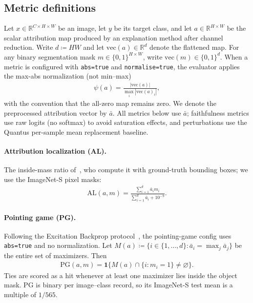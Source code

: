 \documentclass[twoside]{article}
\newcommand{\RR}{\mathbb{R}}
\newcommand{\1}{\mathbf{1}}
\begin{document}
\subsection{Metric definitions}\label{app:metrics}

Let $x \in \RR^{C \times H \times W}$ be an image, let $y$ be its target class, and let $a \in
    \RR^{H \times W}$ be the scalar attribution map produced by an explanation method after channel
reduction. Write $d \coloneqq HW$ and let $\text{vec}(a) \in \RR^d$ denote the flattened map. For
any binary segmentation mask $m \in \{0,1\}^{H \times W}$, write $\text{vec}(m) \in \{0,1\}^d$.
When a metric is configured with \texttt{abs=true} and \texttt{normalise=true}, the evaluator
applies the max-abs normalization (not min--max)
\begin{align}
    \psi(a) = \frac{|\text{vec}(a)|}{\max_i |\text{vec}(a)_i|},
\end{align}
with the convention that the all-zero map remains zero. We denote the preprocessed attribution
vector by $\bar{a}$. All metrics below use $\bar{a}$; faithfulness metrics use raw logits (no
softmax) to avoid saturation effects, and perturbations use the Quantus per-sample mean replacement
baseline.

\paragraph{Attribution localization (AL).} The inside-mass ratio of~\citet{Kohlbrenner2020}, who compute it with ground-truth bounding boxes;
we use the ImageNet-S pixel masks:
\begin{align}
    \text{AL}(a, m) = \frac{\sum_{i=1}^d \bar{a}_i m_i}{\sum_{i=1}^d \bar{a}_i + 10^{-9}}.
\end{align}

\paragraph{Pointing game (PG).} Following the Excitation Backprop protocol~\citep{Zhang2018excitation}, the pointing-game config
uses \texttt{abs=true} and no normalization. Let $M(a) \coloneqq \{i \in \{1, \dots, d\} :
    \bar{a}_i = \max_j \bar{a}_j\}$ be the entire set of maximizers. Then
\begin{align}
    \text{PG}(a, m) = \1\bigl\{M(a) \cap \{i : m_i = 1\} \neq \varnothing\bigr\}.
\end{align}
Ties are scored as a hit whenever at least one maximizer lies inside the object mask. PG is binary
per image--class record, so its ImageNet-S test mean is a multiple of $1/565$.
\end{document}
